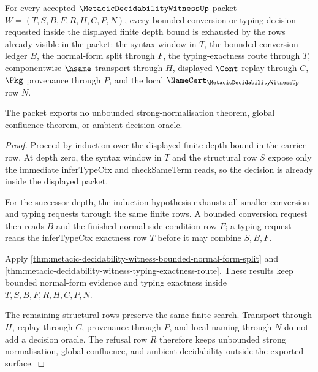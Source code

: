 \begin{theorem}
\label{thm:metacic-decidability-witness-bounded-search-exhaustion}
For every accepted $\MetacicDecidabilityWitnessUp$ packet
$W=(T,S,B,F,R,H,C,P,N)$, every bounded conversion or typing decision requested
inside the displayed finite depth bound is exhausted by the rows already
visible in the packet: the syntax window in $T$, the bounded conversion ledger
$B$, the normal-form split through $F$, the typing-exactness route through
$T$, componentwise $\hsame$ transport through $H$, displayed $\Cont$ replay
through $C$, $\Pkg$ provenance through $P$, and the local
$\NameCert_{\MetacicDecidabilityWitnessUp}$ row $N$.

The packet exports no unbounded strong-normalisation theorem, global
confluence theorem, or ambient decision oracle.
\end{theorem}
\begin{proof}
Proceed by induction over the displayed finite depth bound in the carrier
row. At depth zero, the syntax window in $T$ and the structural row $S$ expose
only the immediate inferTypeCtx and checkSameTerm reads, so the decision is
already inside the displayed packet.

For the successor depth, the induction hypothesis exhausts all smaller
conversion and typing requests through the same finite rows. A bounded
conversion request then reads $B$ and the finished-normal side-condition row
$F$; a typing request reads the inferTypeCtx exactness row $T$ before it may
combine $S,B,F$.

Apply \autoref{thm:metacic-decidability-witness-bounded-normal-form-split} and
\autoref{thm:metacic-decidability-witness-typing-exactness-route}. These
results keep bounded normal-form evidence and typing exactness inside
$T,S,B,F,R,H,C,P,N$.

The remaining structural rows preserve the same finite search. Transport
through $H$, replay through $C$, provenance through $P$, and local naming
through $N$ do not add a decision oracle. The refusal row $R$ therefore keeps
unbounded strong normalisation, global confluence, and ambient decidability
outside the exported surface.
\end{proof}

